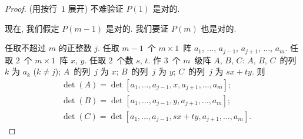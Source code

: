 \documentclass[../libro.tex]{subfiles}
\begin{document}
\begin{proof}
    (用按行~\(1\) 展开)
    不难验证 \(P(1)\) 是对的.

    现在, 我们假定 \(P(m-1)\) 是对的.
    我们要证 \(P(m)\) 也是对的.

    任取不超过 \(m\) 的正整数 \(j\).
    任取 \(m-1\)~个 \(m \times 1\)~阵
    \(a_1\), \(\dots\), \(a_{j-1}\),
    \(a_{j+1}\), \(\dots\), \(a_m\).
    任取 \(2\)~个 \(m \times 1\)~阵 \(x\), \(y\).
    任取 \(2\)~个数 \(s\), \(t\).
    作 \(3\)~个 \(m\)~级阵 \(A\), \(B\), \(C\):
    \(A\), \(B\), \(C\)~的列~\(k\) 为 \(a_k\) (\(k \neq j\));
    \(A\)~的列~\(j\) 为 \(x\);
    \(B\)~的列~\(j\) 为 \(y\);
    \(C\)~的列~\(j\) 为 \(sx + ty\).
    则
    \begin{align*}
        & \det {(A)}
        = \det
        {[a_1, \dots, a_{j-1}, x, a_{j+1}, \dots, a_m]};
        \\
        & \det {(B)}
        = \det
        {[a_1, \dots, a_{j-1}, y, a_{j+1}, \dots, a_m]};
        \\
        & \det {(C)}
        = \det
        {[a_1, \dots, a_{j-1}, sx + ty, a_{j+1}, \dots, a_m]}.
    \end{align*}


\end{proof}
\end{document}
